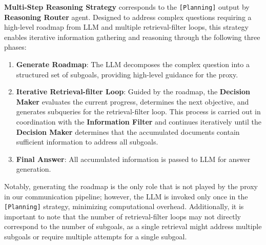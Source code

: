 \textbf{Multi-Step Reasoning Strategy} corresponds to the \texttt{[Planning]} output by \textbf{Reasoning Router} agent. 
Designed to address complex questions requiring a high-level roadmap from LLM and multiple retrieval-filter loops, this strategy enables iterative information gathering and reasoning through the following three phases:
\begin{enumerate}[topsep=1pt, partopsep=1pt, leftmargin=12pt, itemsep=-1pt]
    \item \textbf{Generate Roadmap}: The LLM decomposes the complex question into a structured set of subgoals, providing high-level guidance for the proxy.
    \item \textbf{Iterative Retrieval-filter Loop}: Guided by the roadmap, the \textbf{Decision Maker} evaluates the current progress, determines the next objective, and generates subqueries for the retrieval-filter loop. 
    This process is carried out in coordination with the \textbf{Information Filter} and continues iteratively until the \textbf{Decision Maker} determines that the accumulated documents contain sufficient information to address all subgoals.
    \item \textbf{Final Answer}: All accumulated information is passed to LLM for answer generation.
\end{enumerate}
Notably, generating the roadmap is the only role that is not played by the proxy in our communication pipeline; however, the LLM is invoked only once in the \texttt{[Planning]} strategy, minimizing computational overhead. 
Additionally, it is important to note that the number of retrieval-filter loops may not directly correspond to the number of subgoals, as a single retrieval might address multiple subgoals or require multiple attempts for a single subgoal.


